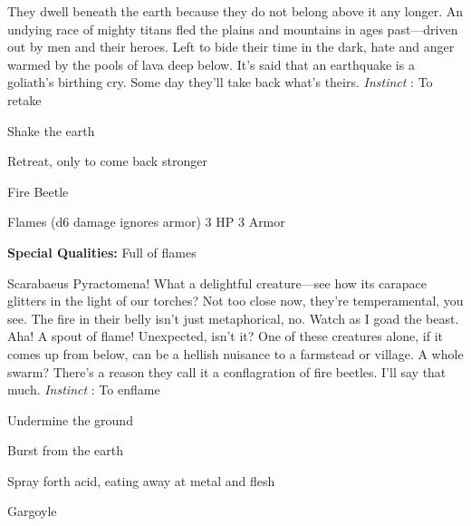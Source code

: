  


 
\startMonsterDescription
They dwell beneath the earth because they do not belong above it any longer. An undying race of mighty titans fled the plains and mountains in ages past—driven out by men and their heroes. Left to bide their time in the dark, hate and anger warmed by the pools of lava deep below. It’s said that an earthquake is a goliath’s birthing cry. Some day they’ll take back what’s theirs. {\em Instinct} : To retake
\stopMonsterDescription
 
\startitemize[1,packed]

\item Shake the earth

 
\item Retreat, only to come back stronger


\stopitemize
 
\startMonsterName
Fire Beetle	 
\stopMonsterName
 

Flames (d6 damage ignores armor)	3 HP	3 Armor

 


 
\startMonsterQualities
{\bf Special Qualities:}  Full of flames
\stopMonsterQualities
 
\startMonsterDescription
Scarabaeus Pyractomena! What a delightful creature—see how its carapace glitters in the light of our torches? Not too close now, they’re temperamental, you see. The fire in their belly isn’t just metaphorical, no. Watch as I goad the beast. Aha! A spout of flame! Unexpected, isn’t it? One of these creatures alone, if it comes up from below, can be a hellish nuisance to a farmstead or village. A whole swarm? There’s a reason they call it a conflagration of fire beetles. I’ll say that much. {\em Instinct} : To enflame
\stopMonsterDescription
 
\startitemize[1,packed]

\item Undermine the ground

 
\item Burst from the earth

 
\item Spray forth acid, eating away at metal and flesh


\stopitemize
 
\startMonsterName
Gargoyle	 
\stopMonsterName
 


